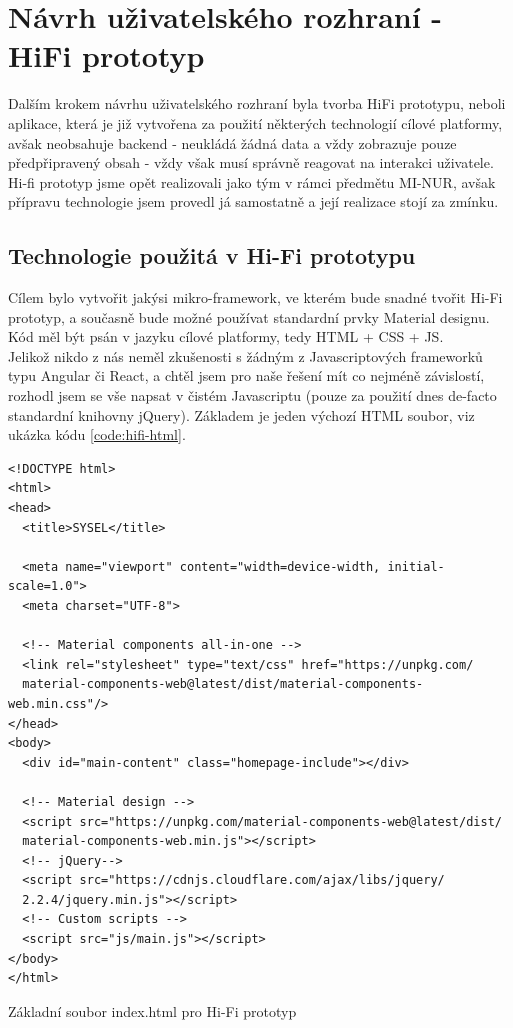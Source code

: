 \section{Návrh uživatelského rozhraní - HiFi prototyp}

Dalším krokem návrhu uživatelského rozhraní byla tvorba HiFi prototypu, neboli aplikace, která je již vytvořena za použití některých technologií cílové platformy, avšak neobsahuje backend - neukládá žádná data a vždy zobrazuje pouze předpřipravený obsah - vždy však musí správně reagovat na interakci uživatele.\\
Hi-fi prototyp jsme opět realizovali jako tým v rámci předmětu MI-NUR, avšak přípravu technologie jsem provedl já samostatně a její realizace stojí za zmínku.

\subsection{Technologie použitá v Hi-Fi prototypu}

Cílem bylo vytvořit jakýsi mikro-framework, ve kterém bude snadné tvořit Hi-Fi prototyp, a současně bude možné používat standardní prvky Material designu. Kód měl být psán v jazyku cílové platformy, tedy HTML + CSS + JS.\\
Jelikož nikdo z nás neměl zkušenosti s žádným z Javascriptových frameworků typu Angular či React, a chtěl jsem pro naše řešení mít co nejméně závislostí, rozhodl jsem se vše napsat v čistém Javascriptu (pouze za použití dnes de-facto standardní knihovny jQuery). Základem je jeden výchozí HTML soubor, viz ukázka kódu \ref{code:hifi-html}.

\begin{listing}[H]
\begin{verbatim}
<!DOCTYPE html>
<html>
<head>
  <title>SYSEL</title>

  <meta name="viewport" content="width=device-width, initial-scale=1.0">
  <meta charset="UTF-8">

  <!-- Material components all-in-one -->
  <link rel="stylesheet" type="text/css" href="https://unpkg.com/
  material-components-web@latest/dist/material-components-web.min.css"/>
</head>
<body>
  <div id="main-content" class="homepage-include"></div>

  <!-- Material design -->
  <script src="https://unpkg.com/material-components-web@latest/dist/
  material-components-web.min.js"></script>
  <!-- jQuery-->
  <script src="https://cdnjs.cloudflare.com/ajax/libs/jquery/
  2.2.4/jquery.min.js"></script>
  <!-- Custom scripts -->
  <script src="js/main.js"></script>
</body>
</html>
\end{verbatim}
\caption{Základní soubor index.html pro Hi-Fi prototyp} \label{code:hifi-html}
\end{listing}

